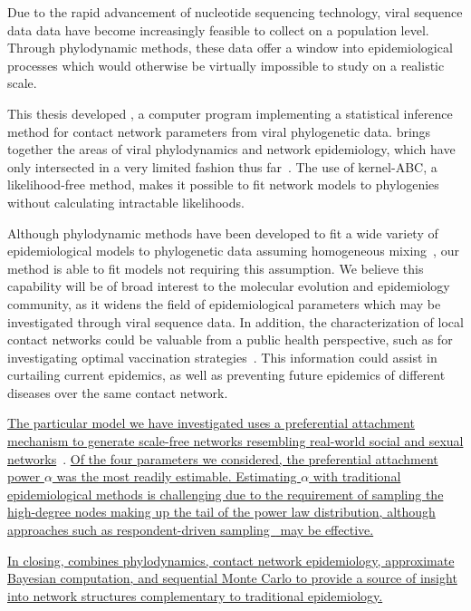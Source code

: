 Due to the rapid advancement of nucleotide sequencing technology, viral
sequence data data have become increasingly feasible to collect on a population
level. Through phylodynamic methods, these data offer a window into
epidemiological processes which would otherwise be virtually impossible to
study on a realistic scale. 

This thesis developed , a computer program implementing a
statistical inference method for contact network parameters from viral
phylogenetic data.  brings together the areas of viral
phylodynamics and network epidemiology, which have only intersected in a very
limited fashion thus far~\autocite{welch2011statistical}. The use of
kernel-\gls{ABC}, a likelihood-free method, makes it possible to fit network
models to phylogenies without calculating intractable likelihoods.

Although phylodynamic methods have been developed to fit a wide variety of
epidemiological models to phylogenetic data assuming homogeneous
mixing~\autocite{volz2012complex, rasmussen2014phylodynamic}, our method is
able to fit models not requiring this assumption. We believe this capability
will be of broad interest to the molecular evolution and epidemiology
community, as it widens the field of epidemiological parameters which may be
investigated through viral sequence data. In addition, the characterization of
local contact networks could be valuable from a public health perspective, such
as for investigating optimal vaccination
strategies~\autocite{keeling2005networks, peng2013vaccination,
ma2013importance, rushmore2014network}. This information could assist in
curtailing current epidemics, as well as preventing future epidemics of
different diseases over the same contact network.

\uline{
The particular model we have investigated uses a preferential attachment
mechanism to generate scale-free networks resembling real-world social and
sexual networks}~\autocite{liljeros2001web, schneeberger2004scale,
colgate1989risk}. \uline{Of the four parameters we considered, the preferential
attachment power $\alpha$ was the most readily estimable. Estimating $\alpha$
with traditional epidemiological methods is challenging due to the requirement
of sampling the high-degree nodes making up the tail of the power law
distribution, although approaches such as respondent-driven
sampling~\autocite{heckathorn1997respondent} may be effective. }

\uline{
In closing,  combines phylodynamics, contact network
epidemiology, approximate Bayesian computation, and sequential Monte Carlo 
to provide a source of insight into network structures complementary to
traditional epidemiology.
}
